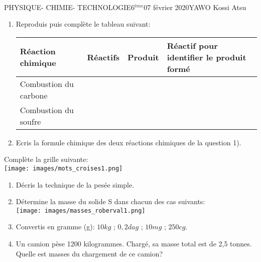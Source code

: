 \documentclass[12pt,a4paper]{book}
\newcommand{\prof}{YAWO Kossi Atsu}
\newcommand{\matiere}{\\PHYSIQUE- CHIMIE- TECHNOLOGIE}
\newcommand{\classe}{6$^{ème}$}
\begin{document}
\newpage
\begin{td}{\matiere}{\classe}{07 février 2020}{\prof}
\begin{exo}
\begin{enumerate}
\item Reproduis puis complète le tableau suivant:\\
\begin{tabular}{|l|p{4cm}|p{4cm}|p{4cm}|}
\hline 
Réaction chimique & Réactifs & Produit & Réactif pour identifier le produit formé \\ 
\hline 
Combustion du carbone &  &  &  \\ 
\hline 
Combustion du soufre &  &  & \\ 
\hline 
\end{tabular} 
\item Ecris la formule chimique des deux réactions chimiques de la question 1).
\end{enumerate}

\end{exo}

\begin{exo}
Complète la grille suivante:\\
\texttt{[image: images/mots\_croises1.png]}
\end{exo}

\begin{exo}
\begin{enumerate}
\item Décris la technique de la pesée simple.
\item Détermine la masse du solide S dans chacun des cas suivants:\\
\texttt{[image: images/masses\_roberval1.png]}
\item Convertis en gramme (g):
$10kg$ \qquad ; \qquad $0,2dag$ \qquad ; \qquad $10mg$ \qquad ; \qquad $250cg$.
\item Un camion pèse 1200 kilogrammes. Chargé, sa masse total est de 2,5 tonnes. Quelle est masses du chargement de ce camion?
\end{enumerate}

\end{exo}
\end{td}
\end{document}

